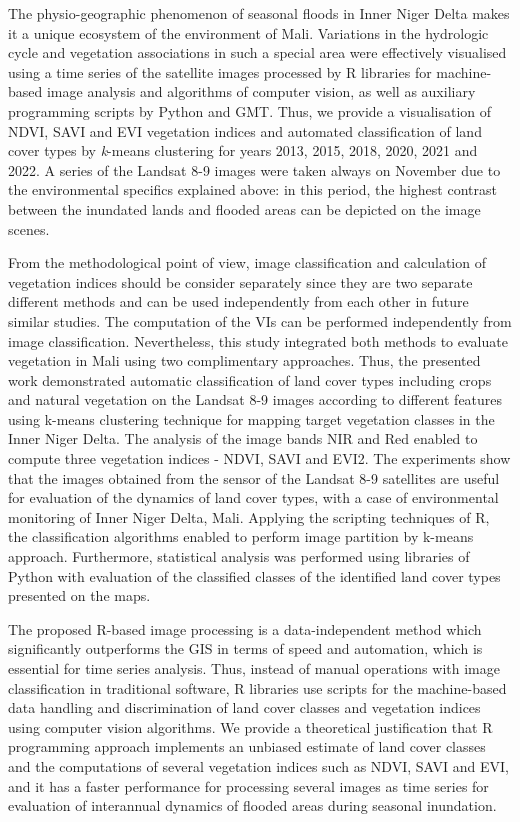 \documentclass[12pt,a4paper,oneside]{article}
\def \newpar{\vspace{6pt}}
\begin{document}
\newpar The physio-geographic phenomenon of seasonal floods in Inner Niger Delta makes it a unique ecosystem of the environment of Mali. Variations in the hydrologic cycle and vegetation associations in such a special area were effectively visualised using a time series of the satellite images processed by R libraries for machine-based image analysis and algorithms of computer vision, as well as auxiliary programming scripts by Python and GMT. Thus, we provide a visualisation of NDVI, SAVI and EVI vegetation indices and automated classification of land cover types by \emph{k}-means clustering for years 2013, 2015, 2018, 2020, 2021 and 2022. A series of the Landsat 8-9 images were taken always on November due to the environmental specifics explained above: in this period, the highest contrast between the inundated lands and flooded areas can be depicted on the image scenes. 

\newpar From the methodological point of view, image classification and calculation of vegetation indices should be consider separately since they are two separate different methods and can be used independently from each other in future similar studies. The computation of the VIs can be performed independently from image classification. Nevertheless, this study integrated both methods to evaluate vegetation in Mali using two complimentary approaches. Thus, the presented work demonstrated automatic classification of land cover types including crops and natural vegetation on the Landsat 8-9 images according to different features using k-means clustering technique for mapping target vegetation classes in the Inner Niger Delta. The analysis of the image bands NIR and Red enabled to compute three vegetation indices - NDVI, SAVI and EVI2. The experiments show that the images obtained from the sensor of the Landsat 8-9 satellites are useful for evaluation of the dynamics of land cover types, with a case of environmental monitoring of Inner Niger Delta, Mali. Applying the scripting techniques of R, the classification algorithms enabled to perform image partition by k-means approach. Furthermore, statistical analysis was performed using libraries of Python with evaluation of the classified classes of the identified land cover types presented on the maps.

\newpar The proposed R-based image processing is a data-independent method which significantly outperforms the GIS in terms of speed and automation, which is essential for time series analysis. Thus, instead of manual operations with image classification in traditional software, R libraries use scripts for the machine-based data handling and discrimination of land cover classes and vegetation indices using computer vision algorithms. We provide a theoretical justification that R programming approach implements an unbiased estimate of land cover classes and the computations of several vegetation indices such as NDVI, SAVI and EVI, and it has a faster performance for processing several images as time series for evaluation of interannual dynamics of flooded areas during seasonal inundation. 
\end{document}
